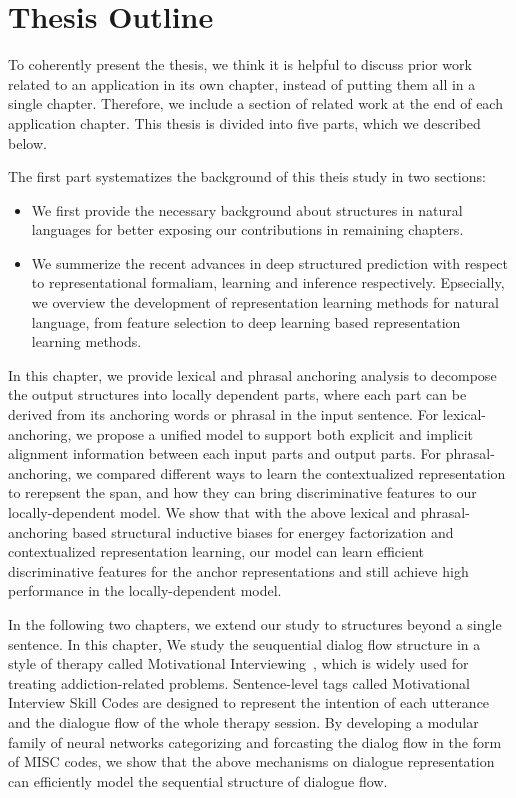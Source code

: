 
\section{Thesis Outline}
\label{sec:intro:roadmap}
To coherently present the thesis, we think it is helpful to discuss
prior work related to an application in its own chapter, instead of
putting them all in a single chapter. Therefore, we include a section
of related work at the end of each application chapter. This thesis is
divided into five parts, which we described below.

 The first part systematizes the
background of this theis study in two sections:
\begin{itemize}
\item {} We first provide the necessary
  background about structures in natural languages for better exposing
  our contributions in remaining chapters.
\item {} We summerize
  the recent advances in deep structured prediction with respect to
  representational formaliam, learning and inference
  respectively. Epsecially, we overview the development of
  representation learning methods for natural language, from feature
  selection to deep learning based representation learning methods.
\end{itemize}

 In this chapter, we provide lexical and phrasal
anchoring analysis to decompose the output structures into locally
dependent parts, where each part can be derived from its anchoring
words or phrasal in the input sentence. For lexical-anchoring, we
propose a unified model to support both explicit and implicit
alignment information between each input parts and output parts. For
phrasal-anchoring, we compared different ways to learn the
contextualized representation to rerepsent the span, and how they can
bring discriminative features to our locally-dependent model. We show
that with the above lexical and phrasal-anchoring based structural
inductive biases for energey factorization and contextualized
representation learning, our model can learn efficient discriminative
features for the anchor representations and still achieve high
performance in the locally-dependent model.

 In the following two chapters, we extend our study to
structures beyond a single sentence. In this chapter, We study the
seuquential dialog flow structure in a style of therapy called
Motivational
Interviewing~\cite[MI,][]{miller2003motivational,miller2012motivational},
which is widely used for treating addiction-related problems.
Sentence-level tags called Motivational Interview Skill Codes are
designed to represent the intention of each utterance and the dialogue
flow of the whole therapy session. By developing a modular family of
neural networks categorizing and forcasting the dialog flow in the
form of MISC codes, we show that the above mechanisms on dialogue
representation can efficiently model the sequential structure of
dialogue flow.

